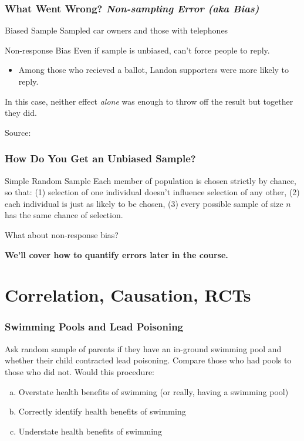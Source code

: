 \documentclass{beamer}
\begin{document}
\begin{frame}
\frametitle{What Went Wrong? \emph{Non-sampling Error (aka Bias)}}
	\begin{block}{Biased Sample}
		Sampled car owners and those with telephones
	\end{block}
	
	\begin{block}{Non-response Bias}
	Even if sample is unbiased, can't force people to reply.
		\begin{itemize}
			\item Among those who recieved a ballot, Landon supporters were more likely to reply.
		\end{itemize}
	\end{block}
	\alert{In this case, neither effect \emph{alone} was enough to throw off the result but together 		they did.}
	
	\tiny{Source: \href{http://www.jstor.org/stable/10.2307/2749114}{}}
\end{frame}

\begin{frame}
\frametitle{How Do You Get an Unbiased Sample?}
	\begin{block}{Simple Random Sample}	
		Each member of population is chosen strictly by chance, so that: (1) selection of one 					individual doesn't influence selection of any other, (2) each individual is just as likely to be 			chosen, (3) every possible sample of size $n$ has the same chance of selection.	
	\end{block}
	
	\begin{block}{What about non-response bias?}
	\end{block}
	
	\textbf{We'll cover how to quantify errors later in the course.}
\end{frame}

\section{Correlation, Causation, RCTs}
\begin{frame}
\frametitle{Swimming Pools and Lead Poisoning}
	Ask random sample of parents if they have an in-ground swimming pool and whether their   			child contracted lead poisoning. Compare those who had pools to those who did not.
	\vspace{1em}
	Would this procedure:
		\begin{enumerate}[(a)]
			\item Overstate health benefits of swimming (or really, having a swimming pool)
			\item Correctly identify health benefits of swimming
			\item Understate health benefits of swimming
		\end{enumerate}
\end{frame}
\end{document}
